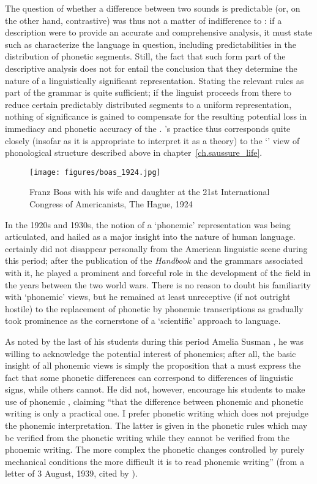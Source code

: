 The question of whether a difference between two sounds is predictable
(or, on the other hand, contrastive) was thus not a matter of
indifference to {\Boas}: if a description were to provide an accurate and
comprehensive analysis, it must state such  as
characterize the language in question, including predictabilities in
the distribution of phonetic segments. Still, the fact that such
 form part of the descriptive analysis does not for {\Boas}
entail the conclusion that they determine the nature of a
linguistically significant representation. Stating the relevant rules
as part of the grammar is quite sufficient; if the linguist proceeds
from there to reduce certain predictably distributed segments to a
uniform representation, nothing of significance is gained to
compensate for the resulting potential loss in immediacy and phonetic
accuracy of the . {\Boas}'s practice thus corresponds quite
closely (insofar as it is appropriate to interpret it as a theory) to
the `' view of phonological structure
described above in chapter~\ref{ch.saussure_life}.

\begin{wrapfigure}{l}{.4\textwidth}
  \texttt{[image: figures/boas\_1924.jpg]}
  \caption{Franz Boas with his wife and daughter at the 21st
    International Congress of Americanists, The Hague, 1924}
  \label{fig:ch.boas.boas_1924}
\end{wrapfigure}
In the 1920s and 1930s, the notion of a `phonemic' representation was
being articulated, and hailed as a major insight into the nature of
human language. {\Boas} certainly did not disappear personally from the
American linguistic scene during this period; after the publication of
the \textsl{Handbook} and the grammars associated with it, he played a
prominent and forceful role in the development of the field in the
years between the two world wars. There is no reason to doubt his
familiarity with `phonemic' views, but he remained at least
unreceptive (if not outright hostile) to the replacement of phonetic
by phonemic transcriptions as  gradually took
prominence as the cornerstone of a `scientific' approach to language.

As noted by the last of his students during this period
Amelia Susman {\Schultz}, he was willing to acknowledge the
potential interest of phonemics; after all, the basic insight of all
phonemic views is simply the proposition that a 
must express the fact that some phonetic differences can correspond to
differences of linguistic signs, while others cannot. He did not,
however, encourage his students to make use of phonemic
, claiming ``that the difference between phonemic and
phonetic writing is only a practical one. I prefer phonetic writing
which does not prejudge the phonemic interpretation. The latter is
given in the phonetic rules which may be verified from the phonetic
writing while they cannot be verified from the phonemic writing. The
more complex the phonetic changes controlled by purely mechanical
conditions the more difficult it is to read phonemic writing'' (from a
letter of 3 August, 1939, cited by
\citealt[56]{schultz77:boas.phonemics}).


